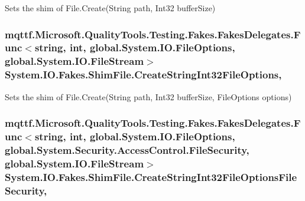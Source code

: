Sets the shim of File.\-Create(\-String path, Int32 buffer\-Size)

\hypertarget{class_system_1_1_i_o_1_1_fakes_1_1_shim_file_a482bdd7d287e0105a3e37cd84461688d}{
\subsubsection[{Create\-String\-Int32\-File\-Options}]{\setlength{\rightskip}{0pt plus 5cm}mqttf.\-Microsoft.\-Quality\-Tools.\-Testing.\-Fakes.\-Fakes\-Delegates.\-Func$<$string, int, global.\-System.\-I\-O.\-File\-Options, global.\-System.\-I\-O.\-File\-Stream$>$ System.\-I\-O.\-Fakes.\-Shim\-File.\-Create\-String\-Int32\-File\-Options\hspace{0.3cm}{\ttfamily [static]}, {\ttfamily [set]}}}\label{class_system_1_1_i_o_1_1_fakes_1_1_shim_file_a482bdd7d287e0105a3e37cd84461688d}


Sets the shim of File.\-Create(\-String path, Int32 buffer\-Size, File\-Options options)

\hypertarget{class_system_1_1_i_o_1_1_fakes_1_1_shim_file_ad47ccb42756f7fd8cccdb04cec034f30}{
\subsubsection[{Create\-String\-Int32\-File\-Options\-File\-Security}]{\setlength{\rightskip}{0pt plus 5cm}mqttf.\-Microsoft.\-Quality\-Tools.\-Testing.\-Fakes.\-Fakes\-Delegates.\-Func$<$string, int, global.\-System.\-I\-O.\-File\-Options, global.\-System.\-Security.\-Access\-Control.\-File\-Security, global.\-System.\-I\-O.\-File\-Stream$>$ System.\-I\-O.\-Fakes.\-Shim\-File.\-Create\-String\-Int32\-File\-Options\-File\-Security\hspace{0.3cm}{\ttfamily [static]}, {\ttfamily [set]}}}\label{class_system_1_1_i_o_1_1_fakes_1_1_shim_file_ad47ccb42756f7fd8cccdb04cec034f30}


